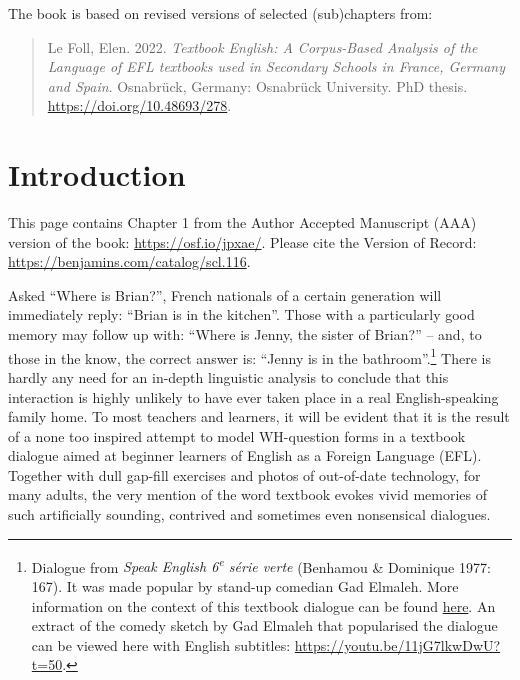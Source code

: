 \documentclass[
  letterpaper,
  DIV=11,
  numbers=noendperiod]{scrreprt}
\begin{document}
The book is based on revised versions of selected (sub)chapters from:

\begin{quote}
Le Foll, Elen. 2022. \emph{Textbook English: A Corpus-Based Analysis of
the Language of EFL textbooks used in Secondary Schools in France,
Germany and Spain}. Osnabrück, Germany: Osnabrück University. PhD
thesis. \url{https://doi.org/10.48693/278}.
\end{quote}


\chapter{Introduction}\label{introduction}

\begin{tcolorbox}[enhanced jigsaw, bottomtitle=1mm, colframe=quarto-callout-note-color-frame, title=\textcolor{quarto-callout-note-color}{\faInfo}\hspace{0.5em}{Note}, colback=white, coltitle=black, colbacktitle=quarto-callout-note-color!10!white, titlerule=0mm, toprule=.15mm, bottomrule=.15mm, breakable, arc=.35mm, left=2mm, rightrule=.15mm, toptitle=1mm, opacityback=0, leftrule=.75mm, opacitybacktitle=0.6]

This page contains Chapter 1 from the Author Accepted Manuscript (AAA)
version of the book: \url{https://osf.io/jpxae/}. Please cite the
Version of Record: \url{https://benjamins.com/catalog/scl.116}.

\end{tcolorbox}

Asked ``Where is Brian?'', French nationals of a certain generation will
immediately reply: ``Brian is in the kitchen''. Those with a
particularly good memory may follow up with: ``Where is Jenny, the
sister of Brian?'' -- and, to those in the know, the correct answer is:
``Jenny is in the bathroom''.\footnote{Dialogue from \emph{Speak English
  6\textsuperscript{e} série verte} (Benhamou \& Dominique 1977: 167).
  It was made popular by stand-up comedian Gad Elmaleh. More information
  on the context of this textbook dialogue can be found
  \href{https://fr.wikipedia.org/wiki/Where_is_Brian\%3F}{here}. An
  extract of the comedy sketch by Gad Elmaleh that popularised the
  dialogue can be viewed here with English subtitles:
  \url{https://youtu.be/11jG7lkwDwU?t=50}.} There is hardly any need for
an in-depth linguistic analysis to conclude that this interaction is
highly unlikely to have ever taken place in a real English-speaking
family home. To most teachers and learners, it will be evident that it
is the result of a none too inspired attempt to model WH-question forms
in a textbook dialogue aimed at beginner learners of English as a
Foreign Language (EFL). Together with dull gap-fill exercises and photos
of out-of-date technology, for many adults, the very mention of the word
textbook evokes vivid memories of such artificially sounding, contrived
and sometimes even nonsensical dialogues.
\end{document}
